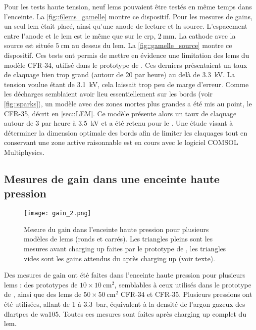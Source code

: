       Pour les tests haute tension, neuf \glspl{lem} pouvaient être testés en même temps dans l'enceinte. La \autoref{fig::6lems_gamelle} montre  ce dispositif. Pour les mesures de gains, un seul \gls{lem} était placé, ainsi qu'une anode de lecture et la source. L'espacement entre l'anode et le \gls{lem} est le même que sur le \gls{crp}, $\SI{2}{\milli\meter}$. La cathode avec la source est située $\SI{5}{\centi\meter}$ au dessus du \gls{lem}. La \autoref{fig::gamelle_source} montre ce dispositif. Ces tests ont permis de mettre en évidence une limitation des \glspl{lem} du modèle CFR-34, utilisé dans le prototype de \TOO{}. Ces derniers présentaient un taux de claquage bien trop grand (autour de 20 par heure) au delà de \SI{3.3}{\kilo\volt}. La tension voulue étant de \SI{3.1}{\kilo\volt}, cela laissait trop peu de marge d'erreur. Comme les décharges semblaient avoir lieu essentiellement sur les bords (voir \autoref{fig::sparks}), un modèle avec des zones mortes plus grandes a été mis au point, le CFR-35, décrit en \autoref{sec::LEM}. Ce modèle présente alors un taux de claquage autour de 3 par heure à \SI{3.5}{\kilo\volt} et a été retenu pour le \SSS{}. Une étude visant à déterminer la dimension optimale des bords afin de limiter les claquages tout en conservant une zone active raisonnable est en cours avec le logiciel COMSOL Multiphysics.

    \subsection{Mesures de gain dans une enceinte haute pression}\label{sec::test_gain}

      \begin{figure}[htpb]
        \texttt{[image: gain\_2.png]}
        \caption[Mesure du gain dans l'enceinte haute pression]{\label{fig::gain_gamelle}Mesure du gain dans l'enceinte haute pression pour plusieurs modèles de \glspl{lem} (ronds et carrés). Les triangles pleins sont les mesures avant charging up faites par le prototype de \threeL{}\cite{Cantini2014}, les triangles vides sont les gains attendus du \threeL{} après charging up (voir texte).}
      \end{figure}

      Des mesures de gain ont été faites dans l'enceinte haute pression pour plusieurs \glspl{lem} : des prototypes de $10\times\SI{10}{\centi\meter\squared}$, semblables à ceux utilisés dans le prototype de \threeL{}, ainsi que des \glspl{lem} de $50\times\SI{50}{\centi\meter\squared}$ CFR-34 et CFR-35. Plusieurs pressions ont été utilisées, allant de 1 à \SI{3.3}{\bar}, équivalent à la densité de l'argon gazeux des \glspl{dlartpc} de \gls{wa105}. Toutes ces mesures sont faites après charging up complet du \gls{lem}.

